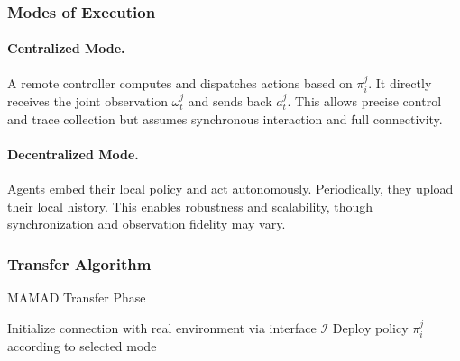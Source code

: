 \documentclass[pdflatex,sn-mathphys-num]{sn-jnl}%
\theoremstyle{thmstyleone}%
\theoremstyle{thmstyletwo}%
\theoremstyle{thmstylethree}%
\begin{document}
\subsubsection*{Modes of Execution}

\paragraph{Centralized Mode.} A remote controller computes and dispatches actions based on $\pi^j_i$. It directly receives the joint observation $\omega_t^j$ and sends back $a_t^j$. This allows precise control and trace collection but assumes synchronous interaction and full connectivity.

\paragraph{Decentralized Mode.} Agents embed their local policy and act autonomously. Periodically, they upload their local history. This enables robustness and scalability, though synchronization and observation fidelity may vary.

\subsubsection*{Transfer Algorithm}

\begin{algorithm}[H]
    \caption{MAMAD Transfer Phase}
    \label{alg:transferring}
    \DontPrintSemicolon

    Initialize connection with real environment via interface $\mathcal{I}$\;
    Deploy policy $\pi^j_i$ according to selected mode\;

\end{algorithm}
\end{document}

